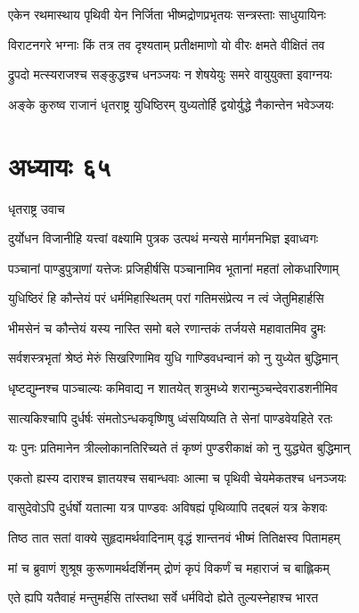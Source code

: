 \twolineshloka
{एकेन रथमास्थाय पृथिवी येन निर्जिता}
{भीष्मद्रोणप्रभृतयः सन्त्रस्ताः साधुयायिनः}


\twolineshloka
{विराटनगरे भग्नाः किं तत्र तव दृश्यताम्}
{प्रतीक्षमाणो यो वीरः क्षमते वीक्षितं तव}


\twolineshloka
{द्रुपदो मत्स्यराजश्च सङ्कुद्धश्च धनञ्जयः}
{न शेषयेयुः समरे वायुयुक्ता इवाग्नयः}


\twolineshloka
{अङ्के कुरुष्व राजानं धृतराष्ट्र युधिष्ठिरम्}
{युध्यतोर्हि द्वयोर्युद्धे नैकान्तेन भवेञ्जयः}


\chapter{अध्यायः ६५}
\twolineshloka
{धृतराष्ट्र उवाच}
{}


\twolineshloka
{दुर्योधन विजानीहि यत्त्वां वक्ष्यामि पुत्रक}
{उत्पथं मन्यसे मार्गमनभिज्ञ इवाध्वगः}


\twolineshloka
{पञ्चानां पाण्डुपुत्राणां यत्तेजः प्रजिहीर्षसि}
{पञ्चानामिव भूतानां महतां लोकधारिणाम्}


\twolineshloka
{युधिष्ठिरं हि कौन्तेयं परं धर्ममिहास्थितम्}
{परां गतिमसंप्रेत्य न त्वं जेतुमिहार्हसि}


\twolineshloka
{भीमसेनं च कौन्तेयं यस्य नास्ति समो बले}
{रणान्तकं तर्जयसे महावातमिव द्रुमः}


\twolineshloka
{सर्वशस्त्रभृतां श्रेष्ठं मेरुं सिखरिणामिव}
{युधि गाण्डिवधन्वानं को नु युध्येत बुद्धिमान्}


\twolineshloka
{धृष्टद्युम्नश्च पाञ्चाल्यः कमिवाद्य न शातयेत्}
{शत्रुमध्ये शरान्मुञ्चन्देवराडशनीमिव}


\twolineshloka
{सात्यकिश्चापि दुर्धर्षः संमतोऽन्धकवृष्णिषु}
{ध्वंसयिष्यति ते सेनां पाण्डवेयहिते रतः}


\twolineshloka
{यः पुनः प्रतिमानेन त्रील्लोकानतिरिच्यते}
{तं कृष्णं पुण्डरीकाक्षं को नु युद्ध्येत बुद्धिमान्}


\twolineshloka
{एकतो ह्यस्य दाराश्च ज्ञातयश्च सबान्धवाः}
{आत्मा च पृथिवी चेयमेकतश्च धनञ्जयः}


\twolineshloka
{वासुदेवोऽपि दुर्धर्षो यतात्मा यत्र पाण्डवः}
{अविषह्यं पृथिव्यापि तद्बलं यत्र केशवः}


\twolineshloka
{तिष्ठ तात सतां वाक्ये सुहृदामर्थवादिनाम्}
{वृद्धं शान्तनवं भीष्मं तितिक्षस्व पितामहम्}


\twolineshloka
{मां च ब्रुवाणं शुश्रूष कुरूणामर्थदर्शिनम्}
{द्रोणं कृपं विकर्णं च महाराजं च बाह्लिकम्}


\twolineshloka
{एते ह्यपि यतैवाहं मन्तुमर्हसि तांस्तथा}
{सर्वे धर्मविदो ह्येते तुल्यस्नेहाश्च भारत}


